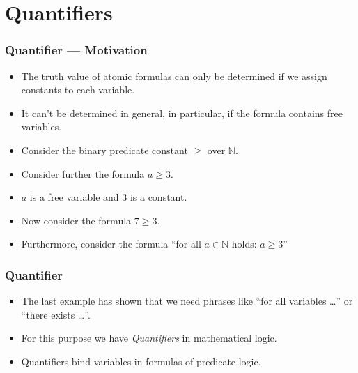 \documentclass{beamer}
\theoremstyle{remark}
\begin{document}
\section{Quantifiers}
\begin{frame}
\frametitle{Quantifier --- Motivation}
\begin{itemize}
	\item The truth value of atomic formulas can only be determined if we assign constants to each variable.
	\item It can't be determined in general, in particular, if the formula contains free variables.
\end{itemize}

\pause

\begin{example}
\begin{itemize}
 	\item Consider the binary predicate constant $\geq$ over $\mathbb{N}$.
	\pause
	\item Consider further the formula $a \geq 3$.
	\pause
	\item $a$ is a free variable and 3 is a constant.
	\pause
	\item Now consider the formula $7 \geq 3$.
	\pause
	\item Furthermore, consider the formula ``for all $a \in \mathbb{N}$ holds: $a \geq 3$''
\end{itemize}
\end{example}
\end{frame}

\begin{frame}
\frametitle{Quantifier}
\begin{itemize}
	\item The last example has shown that we need phrases like ``for all variables \ldots'' or ``there exists \ldots''.
	\pause
	\item For this purpose we have {\em Quantifiers} in mathematical logic.
	\pause
	\item Quantifiers bind variables in formulas of predicate logic.
\end{itemize}
\end{frame}
\end{document}
